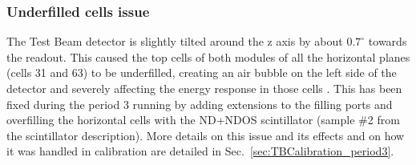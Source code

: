 

\subsubsection*{Underfilled cells issue}
The Test Beam detector is slightly tilted around the z axis by about $0.7^{\circ}$ towards the readout. This caused the top cells of both modules of all the horizontal planes (cells 31 and 63) to be underfilled, creating an air bubble on the left side of the detector and severely affecting the energy response in those cells \cite{LackeyThesisNOvATBProtons2022.pdf}. This has been fixed \cite{NOvA-doc-49439} during the period 3 running by adding extensions to the filling ports and overfilling the horizontal cells with the \gls{ND}+\gls{NDOS} scintillator (sample \#2 from the scintillator description). More details on this issue and its effects and on how it was handled in calibration are detailed in Sec.~\ref{sec:TBCalibration_period3}.



